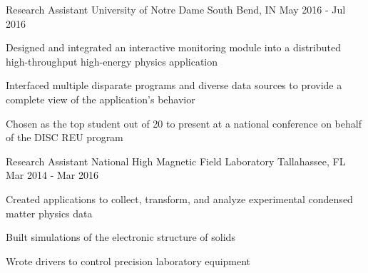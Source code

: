 \begin{cventries}
  \cventry
    {Research Assistant} %
    {University of Notre Dame} %
    {South Bend, IN} %
    {May 2016 - Jul 2016} %
    {
      \begin{cvitems} %
        \item {Designed and integrated an interactive monitoring module into a distributed high-throughput high-energy physics application}
        \item {Interfaced multiple disparate programs and diverse data sources to provide a complete view of the application's behavior}
        \item {Chosen as the top student out of 20 to present at a national conference on behalf of the DISC REU program}
      \end{cvitems}
    }

  \cventry
    {Research Assistant} %
    {National High Magnetic Field Laboratory} %
    {Tallahassee, FL} %
    {Mar 2014 - Mar 2016} %
    {
      \begin{cvitems} %
        \item {Created applications to collect, transform, and analyze experimental condensed matter physics data}
        \item {Built simulations of the electronic structure of solids}
        \item {Wrote drivers to control precision laboratory equipment}
      \end{cvitems}
    }

\end{cventries}
